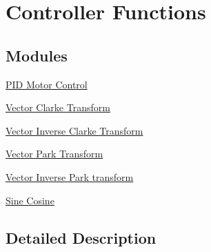 \hypertarget{group__group_controller}{\section{Controller Functions}
\label{group__group_controller}
}
\subsection*{Modules}
\begin{DoxyCompactItemize}
\item 
\hyperlink{group___p_i_d}{P\-I\-D Motor Control}
\item 
\hyperlink{group__clarke}{Vector Clarke Transform}
\item 
\hyperlink{group__inv__clarke}{Vector Inverse Clarke Transform}
\item 
\hyperlink{group__park}{Vector Park Transform}
\item 
\hyperlink{group__inv__park}{Vector Inverse Park transform}
\item 
\hyperlink{group___sin_cos}{Sine Cosine}
\end{DoxyCompactItemize}


\subsection{Detailed Description}
